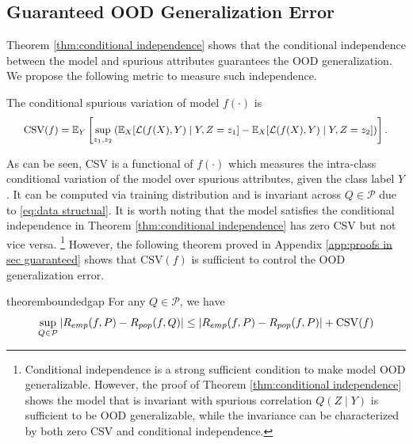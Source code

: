 \documentclass{article} %
\newcommand{\mE}{\mathbb{E}}
\newcommand{\cL}{\mathcal{L}}
\newcommand{\cP}{\mathcal{P}}
\begin{document}
	\subsection{Guaranteed OOD Generalization Error}\label{sec:guaranteed OOD generalization error}
	Theorem \ref{thm:conditional independence} shows that the conditional independence between the model and spurious attributes guarantees the OOD generalization. We propose the following metric to measure such independence.
	\begin{definition}\label{def:csv}
		The conditional spurious variation of model $f(\cdot)$ is
		\begin{equation}
			\small
			\begin{aligned}
				\mathrm{CSV}(f) = \mE_{Y}\left[\sup_{z_{1}, z_{2}}\left(\mE_{X}[\cL(f(X),Y)\mid Y, Z = z_{1}] - \mE_{X}[\cL(f(X), Y)\mid Y, Z = z_{2}]\right)\right].
			\end{aligned}
		\end{equation}
	\end{definition}
	\par
	As can be seen, CSV is a functional of $f(\cdot)$ which measures the intra-class conditional variation of the model over spurious attributes, given the class label $Y$. It can be computed via training distribution and is invariant across $Q\in\cP$ due to \eqref{eq:data structual}. It is worth noting that the model satisfies the conditional independence in Theorem \ref{thm:conditional independence} has zero CSV but not vice versa. \footnote{Conditional independence is a strong sufficient condition to make model OOD generalizable. However, the proof of Theorem \ref{thm:conditional independence} shows the model that is invariant with spurious correlation $Q(Z\mid Y)$ is sufficient to be OOD generalizable, while the invariance can be characterized by both zero CSV and conditional independence.} However, the following theorem proved in Appendix \ref{app:proofs in sec guaranteed} shows that $\mathrm{CSV}(f)$ is sufficient to control the OOD generalization error. 
	\begin{restatable}{theorem}{boundedgap}\label{thm:bounded gap}
		For any $Q\in \cP$, we have 
		\begin{equation}\label{eq:ood gen bound}
			\small
			\sup_{Q\in\cP}|R_{emp}(f, P) - R_{pop}(f, Q)| \leq \left|R_{emp}(f, P) - R_{pop}(f, P)\right| + \mathrm{CSV}(f)
		\end{equation}
	\end{restatable}
\end{document}
